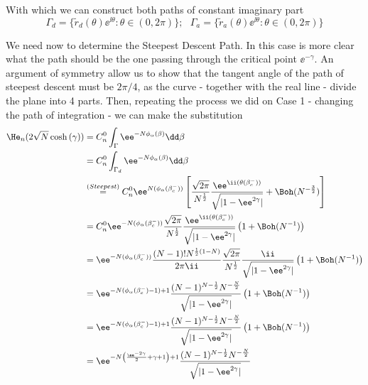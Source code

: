 {With which we can construct both paths of constant imaginary part 
\begin{equation}
	\Gamma_d = \{ \tilde{r}_d(\theta) \ee^{\ii \theta} : \theta \in (0, 2\pi) \}; \ \ \ \Gamma_a = \{ \tilde{r}_a(\theta) \ee^{\ii \theta} : \theta \in (0, 2\pi) \} 
\end{equation}


We need now to determine the Steepest Descent Path. In this case is more clear what the path should be the one passing through the critical point $\ee^{-\gamma}$.  An argument of symmetry allow us to show that the tangent angle of the path of steepest descent must be $2\pi/4$, as the curve - together with the real line - divide the plane into 4 parts. Then, repeating the process we did on Case 1 - changing the path of integration - we can make the substitution
\begin{align}
	\He_{n}(2\sqrt{N}\cosh{(\gamma)}) &= C_n^0 \int_{\Gamma}  \ee^{-N \phi_\alpha(\beta)} \dd \beta \\
	&= C_n^0 \int_{\Gamma_d}  \ee^{-N \phi_\alpha(\beta)} \dd \beta \\
	& \stackrel{(Steepest)}{=}  C_n^0  \ee^{N(\phi_\alpha(\beta_c^-))} 
	\left[
	\frac{\sqrt{2\pi}}{N^{\frac{1}{2}}}
	\frac{\ee^{\ii (\theta(\beta_c^-))}}{\sqrt{|1 - \ee^{2\gamma}|}} 
	+ \Boh(N^{-\frac{3}{2}})
	\right]
	\\
	&= C_n^0  
	\ee^{-N(\phi_\alpha(\beta_c^-))}
	\frac{\sqrt{2\pi}}{N^{\frac{1}{2}}}
	\frac{\ee^{\ii (\theta(\beta_c^-))}}{\sqrt{|1 - \ee^{2\gamma}|}} 
	\left(1 + \Boh(N^{-1}) \right)
	\\
	&= 	\ee^{-N(\phi_\alpha(\beta_c^-))} \frac{(N-1)! N^{\frac{1}{2}\left(1-N\right)}}{2\pi \ii} 
	\frac{\sqrt{2\pi}}{N^{\frac{1}{2}}}
	\frac{\ii}{\sqrt{|1 - \ee^{2\gamma}|}} 
	\left(1 + \Boh(N^{-1}) \right)
	\\
	&= 	\ee^{-N(\phi_\alpha(\beta_c^-) - 1) + 1} \frac{(N-1)^{N - \frac{1}{2}} N^{-\frac{N}{2}}}{\sqrt{|1 - \ee^{2\gamma}|}} 
	\left(1 + \Boh(N^{-1}) \right)
	\\
	& =	\ee^{-N( \phi_\alpha(\beta_c^-) - 1) + 1} \frac{(N-1)^{N - \frac{1}{2}} N^{-\frac{N}{2}}}{\sqrt{|1 - \ee^{2\gamma}|}} 
	\left(1 + \Boh(N^{-1}) \right) \\
	& =	\ee^{-N\left( \frac{\ee^{-2\gamma}}{2} + \gamma +  1\right) + 1} \frac{(N-1)^{N - \frac{1}{2}} N^{-\frac{N}{2}}}{\sqrt{|1 - \ee^{2\gamma}|}} 

\end{align}}

